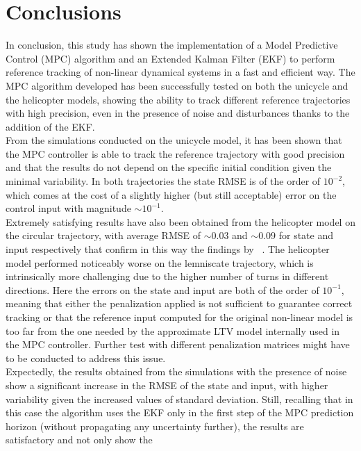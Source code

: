 \documentclass[../main.tex]{subfiles}
\begin{document}
\section{Conclusions}\label{sec:conclusions}

In conclusion, this study has shown the implementation of a Model Predictive
Control (MPC) algorithm and an Extended Kalman Filter (EKF) to perform reference
tracking of non-linear dynamical systems in a fast and efficient way.
The MPC algorithm developed has been successfully tested on both the unicycle
and the helicopter models, showing the ability to track different reference
trajectories with high precision, even in the presence of noise and
disturbances thanks to the addition of the EKF.\\
From the simulations conducted on the unicycle model, it has been shown that the
MPC controller is able to track the reference trajectory with good precision and
that the results do not depend on the specific initial condition given the
minimal variability. In both trajectories the state RMSE is of the order of $10^{-2}$, which comes at
the cost of a slightly higher (but still acceptable) error on the control input
with magnitude $\sim 10^{-1}$.\\
Extremely satisfying results
have also been obtained from the helicopter model on the circular trajectory,
with average RMSE of $\sim 0.03$ and $\sim 0.09$ for state and input
respectively that confirm in this way the findings by ~\cite{helicopter}. The helicopter model performed noticeably worse
on the lemniscate trajectory, which is intrinsically more challenging due to the 
higher number of turns in different directions. Here the errors on the state and
input are both of the order of $10^{-1}$, meaning that either the penalization
applied is not sufficient to guarantee correct tracking or that the reference
input computed for the original non-linear model is too far from the one needed by
the approximate LTV model internally used in the MPC controller. Further test
with different penalization matrices might have to be conducted to address this
issue.\\
Expectedly, the results obtained from the simulations with the presence of noise
show a significant increase in the RMSE of the state and input, with 
higher variability given the increased values of standard deviation. Still,
recalling that in this case the algorithm uses the EKF 
only in the first step of the MPC prediction horizon (without propagating any
uncertainty further), the results are satisfactory and not only show the
\end{document}
